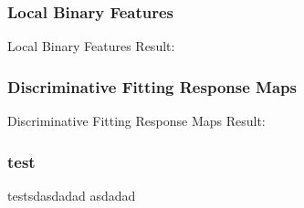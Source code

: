 \documentclass[mathserif]{beamer}%
\begin{document}
\subsubsection{Local Binary Features}
\label{ssub:LBF}
\begin{frame}[t]{Local Binary Features}
    Result:\\
\end{frame}
%
\subsubsection{Discriminative Fitting Response Maps}
\label{ssub:DFRM}
\begin{frame}[t]{Discriminative Fitting Response Maps}
    Result:\\
\end{frame}
%
\begin{frame}
  \frametitle{test}
  \begin{listingBlock}{test}sdasdadad asdadad\end{listingBlock}
\end{frame}
%
\endPresentation%
%
%
%
\end{document}
